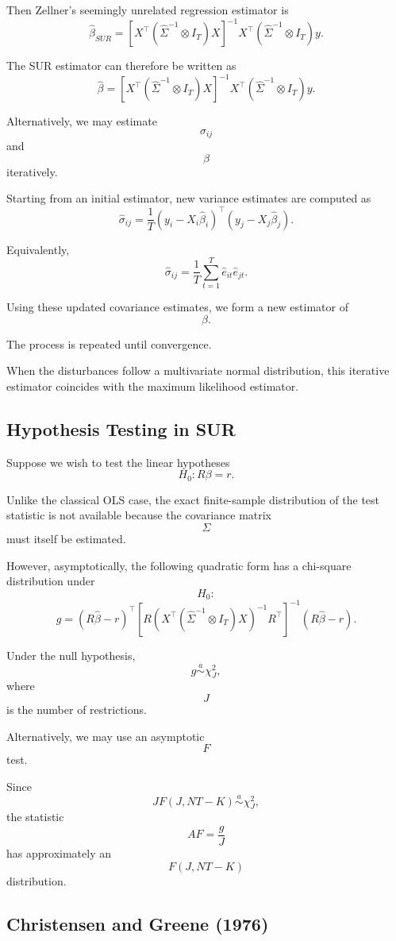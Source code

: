 Then Zellner's seemingly unrelated regression estimator is
\[
\hat\beta_{SUR}
=
\left[
X^\top(\hat\Sigma^{-1}\otimes I_T)X
\right]^{-1}
X^\top(\hat\Sigma^{-1}\otimes I_T)y.
\]

The SUR estimator can therefore be written as
\[
\hat\beta
=
\left[
X^\top
(\hat\Sigma^{-1}\otimes I_T)
X
\right]^{-1}
X^\top
(\hat\Sigma^{-1}\otimes I_T)
y.
\]

Alternatively, we may estimate
\[
\sigma_{ij}
\]
and
\[
\beta
\]
iteratively.

Starting from an initial estimator,
new variance estimates are computed as
\[
\hat\sigma_{ij}
=
\frac{1}{T}
(y_i-X_i\hat\beta_i)^\top
(y_j-X_j\hat\beta_j).
\]

Equivalently,
\[
\hat\sigma_{ij}
=
\frac{1}{T}
\sum_{t=1}^T
\hat e_{it}\hat e_{jt}.
\]

Using these updated covariance estimates,
we form a new estimator of
\[
\beta.
\]

The process is repeated until convergence.

When the disturbances follow a multivariate normal distribution,
this iterative estimator coincides with the maximum likelihood estimator.

\subsection{Hypothesis Testing in SUR}

Suppose we wish to test the linear hypotheses
\[
H_0:R\beta=r.
\]

Unlike the classical OLS case,
the exact finite-sample distribution of the test statistic is not available because the covariance matrix
\[
\Sigma
\]
must itself be estimated.

However, asymptotically,
the following quadratic form has a chi-square distribution under
\[
H_0:
\]
\[
g
=
(R\hat\beta-r)^\top
\left[
R
\left(
X^\top
(\hat\Sigma^{-1}\otimes I_T)
X
\right)^{-1}
R^\top
\right]^{-1}
(R\hat\beta-r).
\]

Under the null hypothesis,
\[
g
\overset{a}{\sim}
\chi^2_J,
\]
where
\[
J
\]
is the number of restrictions.

Alternatively,
we may use an asymptotic
\[
F
\]
test.

Since
\[
JF(J,NT-K)
\overset{a}{\sim}
\chi^2_J,
\]
the statistic
\[
AF
=
\frac{g}{J}
\]
has approximately an
\[
F(J,NT-K)
\]
distribution.

\subsection{Christensen and Greene (1976)}


